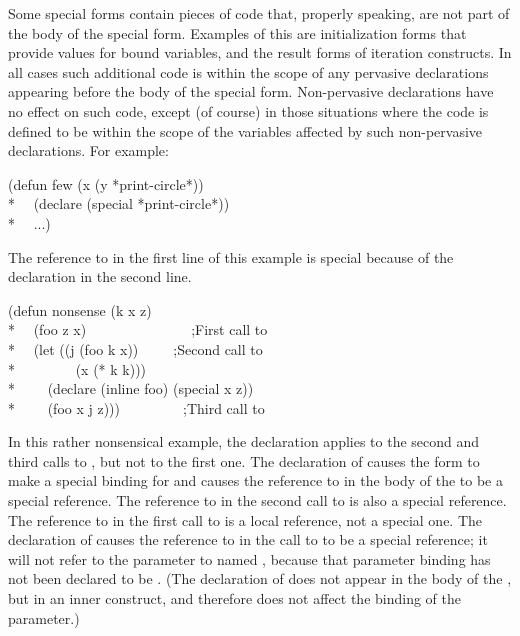 \begin{defspec}
Some special forms contain pieces of code that, properly speaking,
are not part of the body of the special form.  Examples of this
are initialization forms that provide values for bound variables,
and the result forms of iteration constructs.
In all cases such additional code is within the scope of any pervasive
declarations appearing before the body of the special form.
Non-pervasive declarations have no effect on such code, except (of course)
in those situations where the code is defined to be within the scope
of the variables affected by such non-pervasive declarations.
For example:
\begin{lisp}
(defun few (x  (y *print-circle*)) \\*
~~(declare (special *print-circle*)) \\*
~~...)
\end{lisp}
The reference to  in the first line of this example is special
because of the declaration in the second line.
\begin{lisp}
(defun nonsense (k x z) \\*
~~(foo z x)~~~~~~~~~~~~~~~;\textrm{First call to } \\*
~~(let ((j (foo k x))~~~~~;\textrm{Second call to } \\*
~~~~~~~~(x (* k k))) \\*
~~~~(declare (inline foo) (special x z)) \\*
~~~~(foo x j z)))~~~~~~~~~;\textrm{Third call to }
\end{lisp}
In this rather nonsensical example,
the  declaration applies to the
second and third calls to , but not to the first one.
The  declaration of  causes the  form
to make a special binding for  and causes the reference to 
in the body of the  to be a special reference.
The reference to  in the second call to  is also a special
reference.
The reference to  in the first call to  is a local
reference, not a special one.  The  declaration of 
causes the reference to  in the call
to  to be a special reference; it will not
refer to the parameter to  named , because that
parameter binding has not been declared to be .
(The  declaration of  does not appear in the body
of the , but in an inner construct, and therefore does not
affect the binding of the parameter.)


\end{defspec}
